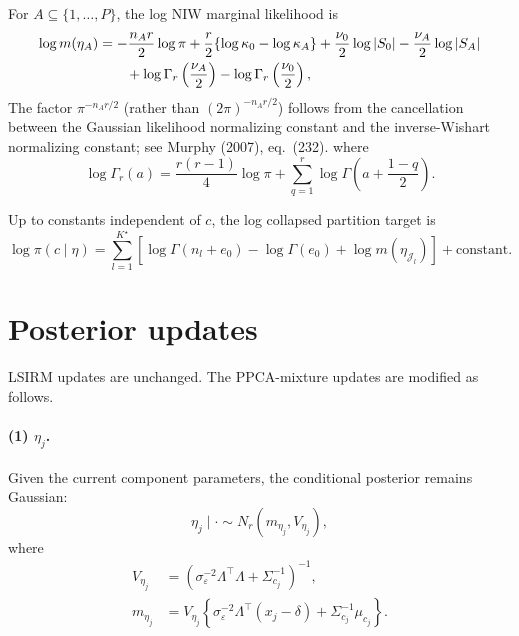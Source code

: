\documentclass[11pt]{article}
\begin{document}
For $A\subseteq\{1,\dots,P\}$, the log NIW marginal likelihood is
\begin{align}
    \log m(\eta_A)
    &=-\frac{n_A r}{2}\log\pi
    +\frac{r}{2}\{\log\kappa_0-\log\kappa_A\}
    +\frac{\nu_0}{2}\log|S_0|
    -\frac{\nu_A}{2}\log|S_A| \notag\\
    &\qquad
    +\log\Gamma_r\left(\frac{\nu_A}{2}\right)
    -\log\Gamma_r\left(\frac{\nu_0}{2}\right),
    \label{eq:niw-marginal}
\end{align}
The factor $\pi^{-n_A r/2}$ (rather than $(2\pi)^{-n_A r/2}$) follows from
the cancellation between the Gaussian likelihood normalizing constant and
the inverse-Wishart normalizing constant; see Murphy (2007), eq.~(232).
where
\[
    \log\Gamma_r(a)
    =\frac{r(r-1)}{4}\log\pi
    +\sum_{q=1}^r\log\Gamma\left(a+\frac{1-q}{2}\right).
\]

Up to constants independent of $c$, the log collapsed partition target is
\begin{equation}
    \log\pi(c\mid\eta)
    =
    \sum_{l=1}^{K^\star}
    \left[
    \log\Gamma(n_l+e_0)-\log\Gamma(e_0)
    +\log m(\eta_{\mathcal J_l})
    \right]
    +\mathrm{constant}.
    \label{eq:log-collapsed-target}
\end{equation}

\section{Posterior updates}

LSIRM updates are unchanged.  The PPCA-mixture updates are modified as
follows.

\paragraph{(1) $\eta_j$.}
Given the current component parameters, the conditional posterior remains
Gaussian:
\begin{equation}
    \eta_j\mid\cdot\sim N_r(m_{\eta_j},V_{\eta_j}),
\end{equation}
where
\begin{align}
    V_{\eta_j}
    &=
    \left(\sigma_\varepsilon^{-2}\Lambda^\top\Lambda+
    \Sigma_{c_j}^{-1}\right)^{-1},\\
    m_{\eta_j}
    &=
    V_{\eta_j}
    \left\{
    \sigma_\varepsilon^{-2}\Lambda^\top(x_j-\delta)
    +\Sigma_{c_j}^{-1}\mu_{c_j}
    \right\}.
    \label{eq:eta-update-v10}
\end{align}
\end{document}
